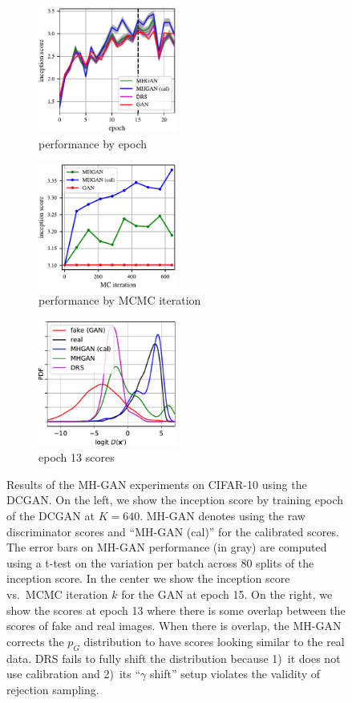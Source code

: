 \documentclass{article}
\newcommand{\PG}{{p_G}}
\begin{document}
\begin{figure}
    \centering
    \begin{subfigure}[b]{0.32\textwidth}
       \centering
       \includegraphics[width=1.8in]{figures/per_epoch.pdf}
       \caption{performance by epoch}
       \label{fig:incep_by_epoch}
    \end{subfigure}
    \begin{subfigure}[b]{0.32\textwidth}
       \centering
       \includegraphics[width=1.8in]{figures/plot_per_mh.pdf}
       \caption{performance by MCMC iteration}
       \label{fig:incep_by_iter}
    \end{subfigure}
    \begin{subfigure}[b]{0.32\textwidth}
       \centering
       \includegraphics[width=1.8in]{figures/score_dist_overlap.pdf}
       \caption{epoch 13 scores}
       \label{fig:score_dist_overlap}
    \end{subfigure}
    \caption{{\small
    Results of the MH-GAN experiments on CIFAR-10 using the DCGAN\@.
    On the left, we show the inception score by training epoch of the DCGAN at $K=640$.
    MH-GAN denotes using the raw discriminator scores and ``MH-GAN (cal)'' for the calibrated scores.
    The error bars on MH-GAN performance (in gray) are computed using a t-test on the variation per batch across 80 splits of the inception score.
    In the center we show the inception score vs.~MCMC iteration $k$ for the GAN at epoch 15.
    On the right, we show the scores at epoch 13 where there is some overlap between the scores of fake and real images.
    When there is overlap, the MH-GAN corrects the $\PG$ distribution to have scores looking similar to the real data.
    DRS fails to fully shift the distribution because 1)~it does not use calibration and 2)~its ``$\gamma$ shift'' setup violates the validity of rejection sampling.
    }}
\end{figure}
\end{document}
